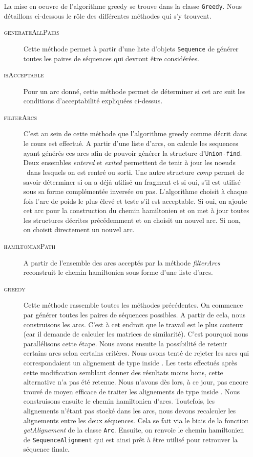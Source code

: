 La mise en oeuvre de l'algorithme greedy se trouve dans la classe \verb|Greedy|. Nous détaillons ci-dessous le rôle des différentes méthodes qui s'y trouvent.

\begin{description}
	\item[\textsc{generateAllPairs}] Cette méthode permet à partir d'une liste d'objets \verb|Sequence| de générer toutes les paires de séquences qui devront être considérées.
	\item[\textsc{isAcceptable}] Pour un arc donné, cette méthode permet de déterminer si cet arc suit les conditions d'acceptabilité expliquées ci-dessus. 
	\item[\textsc{filterArcs}] C'est au sein de cette méthode que l'algorithme greedy comme décrit dans le cours est effectué. A partir d'une liste d'arcs, on calcule les sequences ayant générés ces arcs afin de pouvoir générer la structure d'\verb|Union-find|. Deux ensembles \emph{entered} et \emph{exited} permettent de tenir à jour les \og noeuds \fg~dans lesquels on est rentré ou sorti. Une autre structure \emph{comp} permet de savoir déterminer si on a déjà utilisé un fragment et si oui, s'il est utilisé sous sa forme complémentée inversée ou pas. L'algorithme choisit à chaque fois l'arc de poids le plus élevé et teste s'il est acceptable. Si oui, on ajoute cet arc pour la construction du chemin hamiltonien et on met à jour toutes les structures décrites précédemment et on choisit un nouvel arc. Si non, on choisit directement un nouvel arc.
	\item[\textsc{hamiltonianPath}] A partir de l'ensemble des arcs acceptés par la méthode \emph{filterArcs} reconstruit le chemin hamiltonien sous forme d'une liste d'arcs.
	\item[\textsc{greedy}] Cette méthode rassemble toutes les méthodes précédentes. On commence par générer toutes les paires de séquences possibles. A partir de cela, nous construisons les arcs. C'est à cet endroit que le travail est le plus couteux (car il demande de calculer les matrices de similarité). C'est pourquoi nous parallélisons cette étape. Nous avons ensuite la possibilité de retenir certains arcs selon certains critères. Nous avons tenté de rejeter les arcs qui correspondaient un alignement de type \og inside \fg. Les tests effectués après cette modification semblant donner des résultats moins bons, cette alternative n'a pas été retenue. Nous n'avons dès lors, à ce jour, pas encore trouvé de moyen efficace de traiter les alignements de type \og inside \fg. Nous construisons ensuite le chemin hamiltonien d'arcs. Toutefois, les alignements n'étant pas stocké dans les arcs, nous devons recalculer les alignements entre les deux séquences. Cela se fait via le biais de la fonction \emph{getAlignement} de la classe \verb|Arc|. 
	Ensuite, on renvoie le chemin hamiltonien de \verb|SequenceAlignment| qui est ainsi prêt à être utilisé pour retrouver la séquence finale.	
\end{description}



